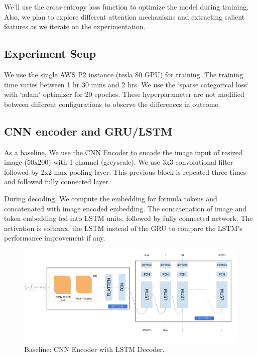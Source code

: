\documentclass{article}
\begin{document}

We'll use the cross-entropy loss function to optimize the model during training. Also, we plan to explore different attention mechanisms and extracting salient features as we iterate on the experimentation.

\subsection{Experiment Seup}
We use the single AWS P2 instance (tesla 80 GPU) for training. The training time varies between  1 hr 30 mins and 2 hrs. We use the `sparse categorical loss` with `adam` optimizer for 20 epoches. These hyperparameter are not modified between different configurations to observe the differences in outcome.

\subsection{CNN encoder and GRU/LSTM}
As a baseline, We use the CNN Encoder to encode the image input of resized image (50x200) with 1 channel (greyscale). We use 3x3 convolutional filter followed by 2x2 max pooling layer. This previous block is repeated three times and followed fully connected layer.

During decoding, We compute the embedding for formula tokens and concatenated with image encoded embedding. The concatenation of image and token embedding fed into LSTM units, followed by fully connected network. The activation is softmax. the LSTM instead of the GRU to compare the LSTM's performance improvement if any.

\begin{figure}[H]
    \centering
    \includegraphics[scale=0.4]{fig_CNN_LSTM.png}
    \caption{Baseline: CNN Encoder with LSTM Decoder.}
    \label{fig:cnn_lstm}
\end{figure}
\end{document}
